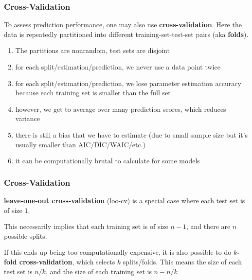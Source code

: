 \documentclass{beamer}
\begin{document}
\begin{frame}
\frametitle{Cross-Validation}

To assess prediction performance, one may also use {\bf cross-validation}. Here the data is repeatedly partitioned into different training-set-test-set pairs (aka {\bf folds}).
\pause

\begin{enumerate}
\item The partitions are nonrandom, test sets are disjoint
\item for each split/estimation/prediction, we never use a data point twice
\item for each split/estimation/prediction, we lose parameter estimation accuracy because each training set is smaller than the full set
\item however, we get to average over many prediction scores, which reduces variance
\item there is still a bias that we have to estimate (due to small
  sample size but it's usually smaller than AIC/DIC/WAIC/etc.)
\item it can be computationally brutal to calculate for some models
\end{enumerate}



\end{frame}

\begin{frame}
\frametitle{Cross-Validation}


{\bf leave-one-out cross-validation} (loo-cv) is a special case where each test set is of size $1$.
\newline

This necessarily implies that each training set is of size $n-1$, and there are $n$ possible splits.
\newline

If this ends up being too computationally expensive, it is also possible to do {\bf $k$-fold cross-validation}, which selects $k$ splits/folds. This means the size of each test set is $n/k$, and the size of each training set is $n -n/k$

\end{frame}
\end{document}

